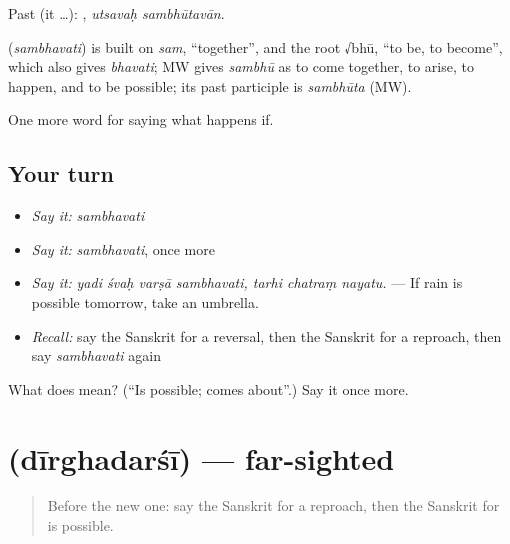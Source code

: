 Past (it …):  , \emph{utsavaḥ sambhūtavān}.

\begin{cousinweb}
\textbf{} (\emph{sambhavati}) is built on \emph{sam}, \textquotedblleft{}together\textquotedblright{}, and the root √bhū, \textquotedblleft{}to be, to become\textquotedblright{}, which also gives \emph{bhavati}; MW gives \emph{sambhū} as to come together, to arise, to happen, and to be possible; its past participle is \emph{sambhūta} (MW).
\end{cousinweb}

\begin{grammarlens}[title={What you've built}]
One more word for saying what happens if.
\end{grammarlens}

\subsection*{Your turn}
\begin{itemize}
\raggedright
  \item \emph{Say it:} \emph{sambhavati}
  \item \emph{Say it:} \emph{sambhavati}, once more
  \item \emph{Say it:} \emph{yadi śvaḥ varṣā sambhavati, tarhi chatraṃ nayatu.} — If rain is possible tomorrow, take an umbrella.
  \item \emph{Recall:} say the Sanskrit for a reversal, then the Sanskrit for a reproach, then say \emph{sambhavati} again
\end{itemize}

\begin{tcolorbox}[breakable,colback=teal!4,colframe=teal!35!black,title={Before you move on}]
What does  mean? (\textquotedblleft{}Is possible; comes about\textquotedblright{}.) Say it once more.
\end{tcolorbox}
\section[\texorpdfstring{\sk{दीर्घदर्शी} (dīrghadarśī)}{दीर्घदर्शी (dīrghadarśī)}]{ (dīrghadarśī) — far-sighted}

\label{lesson:SA-C554-dirghadarsi}



\begin{quote}
Before the new one: say the Sanskrit for a reproach, then the Sanskrit for is possible.
\end{quote}


